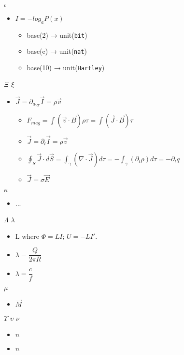  $\iota$\begin{itemize}
	\item $I = - log_a P(x)$ %
	\begin{itemize}
		\item base(2) → unit(\verb`bit`)
		\item base(e) → unit(\verb`nat`)
		\item base(10) → unit(\verb`Hartley`)
	\end{itemize}
\end{itemize}

 $\Xi$ $\xi$\begin{itemize}
	\item $\vec{J} = \partial_{a_{VT}}\vec{I} = \rho\vec{v}$ %
	\begin{itemize}
		\item $F_{mag} = \int(\vec{v}\cdot\vec{B})\rho\tau = \int(\vec{J}\cdot\vec{B})\tau$
		\item $\vec{J} = \partial_{l}\vec{I} = \rho\vec{v}$%
		\item $\oint_S \vec{J}\cdot d\vec{S} = \int_\gamma(\nabla \cdot \vec{J})d\tau = -\int_\gamma(\partial_t\rho)d\tau = -\partial_t q$%
		\item $\vec{J} = \sigma \vec{E}$ %
	\end{itemize}
\end{itemize}

 $\kappa$ \begin{itemize}
	\item ...
\end{itemize}

 $\Lambda$ $\lambda$\begin{itemize}
	\item L %
		where $\Phi=LI$; $U = -LI'$.
	\item $\lambda = \dfrac Q {2 \pi R}$ %
	\item $\lambda = \dfrac{c}{f}$%
\end{itemize}

 $\mu$\begin{itemize}
	\item $\vec{M}$ %
\end{itemize}

  $\Upsilon$ $\upsilon$ $\nu$\begin{itemize}
	\item $n$ %
	\item $\hat{n}$ %
\end{itemize}


